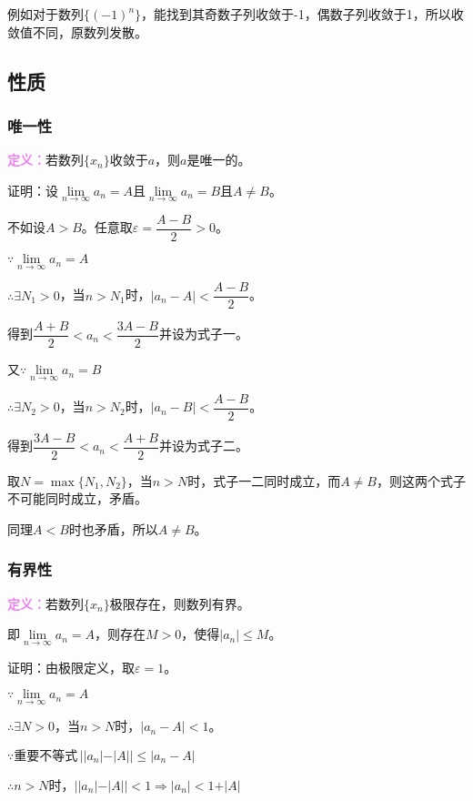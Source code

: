 \documentclass[UTF8, 12pt]{ctexart}
\begin{document}
例如对于数列$\{(-1)^n\}$，能找到其奇数子列收敛于-1，偶数子列收敛于1，所以收敛值不同，原数列发散。

\subsection{性质}
\subsubsection{唯一性}

\textcolor{violet}{\textbf{定义：}}若数列$\{x_n\}$收敛于$a$，则$a$是唯一的。

证明：设$\lim\limits_{n\to\infty}a_n=A$且$\lim\limits_{n\to\infty}a_n=B$且$A\neq B$。

不如设$A>B$。任意取$\varepsilon=\dfrac{A-B}{2}>0$。

$\because\lim\limits_{n\to\infty}a_n=A$

$\therefore\exists N_1>0$，当$n>N_1$时，$\vert a_n-A\vert<\dfrac{A-B}{2}$。

得到$\dfrac{A+B}{2}<a_n<\dfrac{3A-B}{2}$并设为式子一。

又$\because\lim\limits_{n\to\infty}a_n=B$

$\therefore\exists N_2>0$，当$n>N_2$时，$\vert a_n-B\vert<\dfrac{A-B}{2}$。

得到$\dfrac{3A-B}{2}<a_n<\dfrac{A+B}{2}$并设为式子二。

取$N=\max\{N_1,N_2\}$，当$n>N$时，式子一二同时成立，而$A\neq B$，则这两个式子不可能同时成立，矛盾。

同理$A<B$时也矛盾，所以$A\neq B$。

\subsubsection{有界性}

\textcolor{violet}{\textbf{定义：}}若数列$\{x_n\}$极限存在，则数列有界。

即$\lim\limits_{n\to\infty}a_n=A$，则存在$M>0$，使得$\vert a_n\vert\leqslant M$。

证明：由极限定义，取$\varepsilon=1$。

$\because\lim\limits_{n\to\infty}a_n=A$

$\therefore\exists N>0$，当$n>N$时，$\vert a_n-A\vert<1$。

$\because\text{重要不等式}\,\vert\vert a_n\vert-\vert A\vert\vert\leqslant\vert a_n-A\vert$

$\therefore n>N$时，$\vert\vert a_n\vert-\vert A\vert\vert<1\Rightarrow\vert a_n\vert<1+\vert A\vert$
\end{document}
